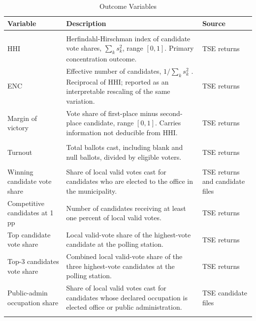\documentclass[11pt]{article}
\begin{document}
\begin{table}[H]
\centering
\caption{Outcome Variables}\label{tab:outcomes}
\begin{threeparttable}
\footnotesize
\begin{tabularx}{\textwidth}{@{}>{\raggedright\arraybackslash}p{}>{\raggedright\arraybackslash}X>{\raggedright\arraybackslash}p{}@{}}
\toprule
Variable & Description & Source \\
\midrule
\multicolumn{3}{@{}l}{\textit{Electoral competition}} \\
HHI                & Herfindahl-Hirschman index of candidate vote shares, $\sum_k s_k^2$, range $[0,1]$. Primary concentration outcome. & TSE returns \\[2pt]
ENC                & Effective number of candidates, $1/\sum_k s_k^2$ \citep{laakso1979}. Reciprocal of HHI; reported as an interpretable rescaling of the same variation. & TSE returns \\[2pt]
Margin of victory  & Vote share of first-place minus second-place candidate, range $[0,1]$. Carries information not deducible from HHI. & TSE returns \\[2pt]
\multicolumn{3}{@{}l}{\textit{Participation}} \\
Turnout            & Total ballots cast, including blank and null ballots, divided by eligible voters. & TSE returns \\[3pt]
\multicolumn{3}{@{}l}{\textit{Candidate selection}} \\
Winning candidate vote share & Share of local valid votes cast for candidates who are elected to the office in the municipality. & TSE returns and candidate files \\[2pt]
Competitive candidates at 1 pp & Number of candidates receiving at least one percent of local valid votes. & TSE returns \\[2pt]
Top candidate vote share & Local valid-vote share of the highest-vote candidate at the polling station. & TSE returns \\[2pt]
Top-3 candidates vote share & Combined local valid-vote share of the three highest-vote candidates at the polling station. & TSE returns \\[2pt]
Public-admin occupation share & Share of local valid votes cast for candidates whose declared occupation is elected office or public administration. & TSE candidate files \\[3pt]
\multicolumn{3}{@{}l}{\textit{Campaign finance}} \\

\end{tabularx}
\end{threeparttable}
\end{table}
\end{document}
